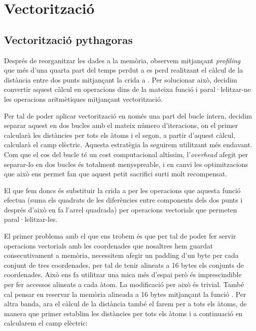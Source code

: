 
\section{Vectorització}

\subsection{Vectorització pythagoras}

Després de reorganitzar les dades a la memòria, observem mitjançant \emph{profiling} que més d'una quarta part del temps perdut a  es perd realitzant el càlcul de la distància entre dos punts mitjançant la crida a . Per solucionar això, decidim convertir aquest càlcul en operacions dins de la mateixa funció  i paral·lelitzar-ne les operacions aritmètiques mitjançant vectorització.

Per tal de poder aplicar vectorització en només una part del bucle intern, decidim separar aquest en dos bucles amb el mateix número d'iteracions, on el primer calcularà les distàncies per tots els àtoms i el segon, a partir d'aquest càlcul, calcularà el camp elèctric. Aquesta estratègia la seguirem utilitzant més endavant. Com que el cos del bucle té un cost computacional altíssim, l'\emph{overhead} afegit per separar-lo en dos bucles és totalment menyspreable, i en canvi les optimitzacions que això ens permet fan que aquest petit sacrifici surti molt recompensat.

El que fem doncs és substituir la crida a  per les operacions que aquesta funció efectua (suma els quadrats de les diferències entre components dels dos punts i després d'això en fa l'arrel quadrada) per operacions vectorials que permeten paral·lelitzar-les.

El primer problema amb el que ens trobem és que per tal de poder fer servir operacions vectorials amb les coordenades que nosaltres hem guardat consecutivament a memòria, necessitem afegir un padding d'un byte per cada conjunt de tres coordenades, per tal de tenir alineats a 16 bytes els conjunts de coordenades. Això ens fa utilitzar una mica més d'espai però és imprescindible per fer accessos alineats a cada àtom. La modificació per això és trivial. També cal pensar en reservar la memòria alineada a 16 bytes mitjançant la funció . Per altra banda, ara el càlcul de la distància també el farem per a tots els àtoms, de manera que primer establim les distàncies per tots els àtoms i a continuació en calcularem el camp elèctric:

